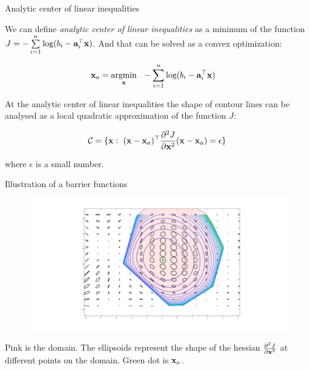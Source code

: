 \documentclass{beamer}
\begin{document}
\begin{frame}{Analytic center of linear inequalities}
\begin{flushleft}

We can define \emph{analytic center of linear inequalities} as a minimum of the function $J = -\sum\limits_{i = 1}^n \text{log} (b_i - \mathbf{a}_i^\top \mathbf{x})$. And that can be solved as a convex optimization:

\begin{align*}
    \bo{x}_a = \underset{\bo{x}}{\text{argmin}} & \ \  -\sum\limits_{i = 1}^n \text{log} (b_i - \bo{a}_i^\top \bo{x})
\end{align*}

At the analytic center of linear inequalities the shape of contour lines can be analysed as a local quadratic approximation of the function $J$:

\begin{equation}
    \mathcal{C} = \{ \mathbf{x}: \ (\mathbf{x} - \mathbf{x}_a)^\top \frac{\partial^2 J}{\partial \mathbf{x}^2} (\mathbf{x} - \mathbf{x}_a) = \epsilon \}
\end{equation}

where $\epsilon$ is a small number.
  
\end{flushleft}
\end{frame}



\begin{frame}{Illustration of a barrier functions}
\begin{flushleft}

\begin{figure}
    \centering
    \includegraphics[width=\linewidth]{LogBarrier2.png}
    \label{fig:BarrierFunctions}
\end{figure}

Pink is the domain. The ellipsoids represent the shape of the hessian $\frac{\partial^2 J}{\partial \mathbf{x}^2}$ at different points on the domain. Green dot is $\mathbf{x}_a$.

\end{flushleft}
\end{frame}







%
%



\myqrframe
\end{document}
